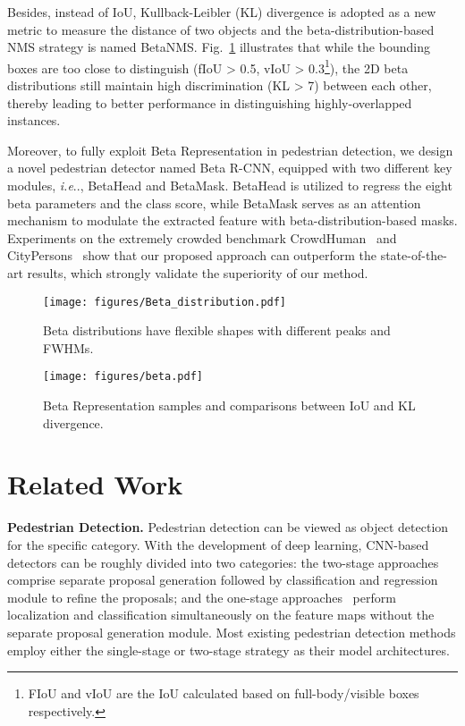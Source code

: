 \documentclass{article}
\makeatletter
\DeclareRobustCommand\onedot{\futurelet\@let@token\@onedot}
\def\@onedot{\ifx\@let@token.\else.\null\fi\xspace}
\def\ie{\emph{i.e}\onedot} \def\Ie{\emph{I.e}\onedot}
\makeatother
\begin{document}
Besides, instead of IoU, Kullback-Leibler (KL) divergence is adopted as a new metric to measure the distance of two objects and the beta-distribution-based NMS strategy is named BetaNMS.
Fig.~\ref{beta} illustrates that while the bounding boxes are too close to distinguish (fIoU > 0.5, vIoU > 0.3\footnote{FIoU and vIoU are the IoU calculated based on full-body/visible boxes respectively.}), the 2D beta distributions still maintain high discrimination (KL > 7) between each other, thereby leading to better performance in distinguishing highly-overlapped instances.

Moreover, to fully exploit Beta Representation in pedestrian detection, we design a novel pedestrian detector named Beta R-CNN, equipped with two different key modules, \ie, BetaHead and BetaMask. 
BetaHead is utilized to regress the eight beta parameters and the class score, while BetaMask serves as an attention mechanism to modulate the extracted feature with beta-distribution-based masks.
Experiments on the extremely crowded benchmark CrowdHuman~\cite{crowdhuman} and CityPersons~\cite{citypersons} show that our proposed approach can outperform the state-of-the-art results, which strongly validate the superiority of our method.



\begin{figure}[t]
    \centering
    \begin{minipage}[t]{0.45\textwidth}
        \flushleft
        \setcaptionmargin{0.1cm}
        \texttt{[image: figures/Beta\_distribution.pdf]}
        \caption{Beta distributions have flexible shapes with different peaks and FWHMs.}
        \label{beta distribution}
    \end{minipage}
    \begin{minipage}[t]{0.52\textwidth}
        \centering
        \setcaptionmargin{0.1cm}
        \texttt{[image: figures/beta.pdf]}
        \caption{Beta Representation samples and comparisons between IoU and KL divergence.}
        \label{beta}
    \end{minipage}
\end{figure}



\section{Related Work}
\textbf{Pedestrian Detection.}
Pedestrian detection can be viewed as object detection for the specific category.
With the development of deep learning, CNN-based detectors can be roughly divided into two categories:
the two-stage approaches~\cite{fast, faster} comprise separate proposal generation followed by classification and regression module to refine the proposals; and the one-stage approaches~\cite{SSD, YOLO, focal} perform localization and classification simultaneously on the feature maps without the separate proposal generation module.
Most existing pedestrian detection methods employ either the single-stage or two-stage strategy as their model architectures.
\end{document}
